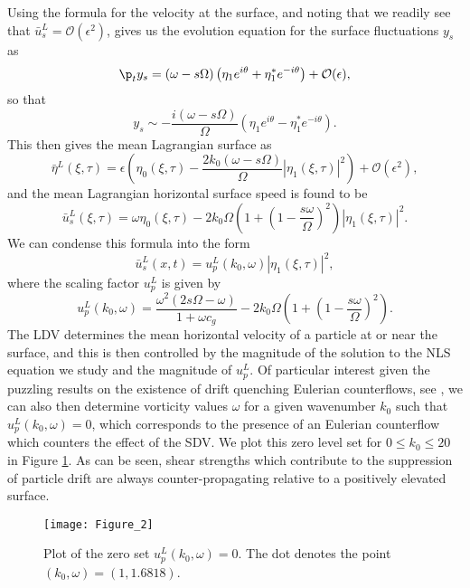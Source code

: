 \documentclass{JFM_Style/jfm}
\begin{document}
Using the formula for the velocity at the surface, and noting that we readily see that $\bar{u}^{L}_{s} = \mathcal{O}(\epsilon^{2})$, gives us the evolution equation for the surface fluctuations $y_{s}$ as
\[
\p_{t}y_{s} = (\omega -s\Omega) \left(\eta_{1}e^{i\theta} + \eta_{1}^{\ast}e^{-i\theta}\right) + \mathcal{O}(\epsilon),
\]
so that
\[
y_{s} \sim -\frac{i(\omega-s\Omega)}{\Omega}  \left(\eta_{1}e^{i\theta} - \eta_{1}^{\ast}e^{-i\theta}\right).
\]
This then gives the mean Lagrangian surface as
\[
\bar{\eta}^{L}(\xi,\tau) = \epsilon \left(\eta_{0}(\xi,\tau) - \frac{2k_{0}(\omega-s\Omega)}{\Omega}|\eta_{1}(\xi,\tau)|^{2}\right) + \mathcal{O}(\epsilon^{2}),
\]
and the mean Lagrangian horizontal surface speed is found to be
\[
\bar{u}^{L}_{s}(\xi,\tau) = \omega\eta_{0}(\xi,\tau)-2k_{0}\Omega\left( 1 + \left(1-\frac{s\omega}{\Omega}\right)^{2}\right)|\eta_{1}(\xi,\tau)|^{2}.
\]
We can condense this formula into the form
\[
\bar{u}^{L}_{s}(x,t) = u^{L}_{p}(k_{0},\omega)|\eta_{1}(\xi,\tau)|^{2},
\]
where the scaling factor $u^{L}_{p}$ is given by
\[
u^{L}_{p}(k_{0},\omega) =  \frac{ \omega^{2}(2s\Omega - \omega)}{1+\omega c_{g}} - 2k_{0}\Omega\left(1 + \left(1 - \frac{s\omega}{\Omega} \right)^{2}\right).
\]
The LDV determines the mean horizontal velocity of a particle at or near the surface, and this is then controlled by the magnitude of the solution to the NLS equation we study and the magnitude of $u^{L}_{p}$.  Of particular interest given the puzzling results on the existence of drift quenching Eulerian counterflows, see \cite{monismith,smith}, we can also then determine vorticity values $\omega$ for a given wavenumber $k_{0}$ such that $u^{L}_{p}(k_{0},\omega) =0$, which corresponds to the presence of an Eulerian counterflow which counters the effect of the SDV.  We plot this zero level set for $0\leq k_{0}\leq 20$ in Figure \ref{fig:zerodriftk0}.  As can be seen, shear strengths which contribute to the suppression of particle drift are always counter-propagating relative to a positively elevated surface.
\begin{figure}
\centering
\texttt{[image: Figure\_2]}
\caption{\small Plot of the zero set $u^{L}_{p}(k_{0},\omega)=0$.  The dot denotes the point $(k_{0},\omega)=(1,1.6818)$.}
\label{fig:zerodriftk0}
\end{figure}
\end{document}
